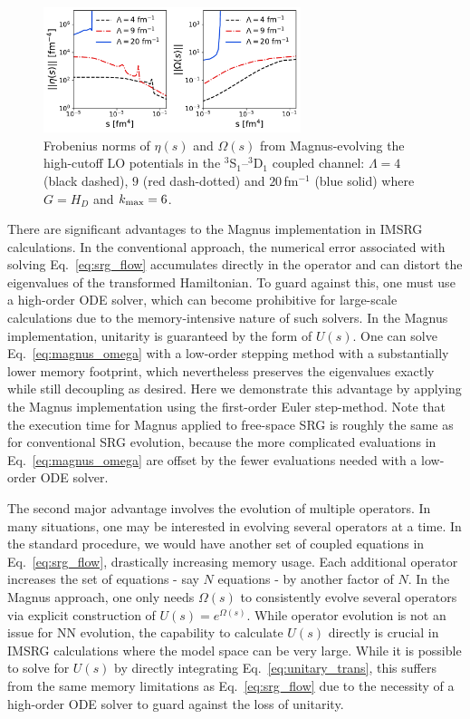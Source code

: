 \documentclass[10pt,aps,prc,floatfix,twocolumn,nofootinbib]{revtex4-1}
\begin{document}
%
\begin{figure}[tbh]
	\includegraphics[clip,width=0.67\textwidth]{eta_omega_norms_kvnns_900_901_902_3S1_Wegner_k_magnus_6_ds1p0e-05.pdf}%
	\caption{Frobenius norms of $\eta(s)$ and $\Omega(s)$ from Magnus-evolving the high-cutoff LO potentials in the $^3$S$_1$--$^3$D$_1$ coupled channel: $\Lambda=4$ (black dashed), $9$ (red dash-dotted) and $20$\,fm$^{-1}$ (blue solid) where $G=H_D$ and $k_{\rm max}=6$.}
	\label{fig:eta_omega_norms}
\end{figure}
%

There are significant advantages to the Magnus implementation in IMSRG calculations.
In the conventional approach, the numerical error associated with solving Eq.~\eqref{eq:srg_flow} accumulates directly in the operator and can distort the eigenvalues of the transformed Hamiltonian.
To guard against this, one must use a high-order ODE solver, which can become prohibitive for large-scale calculations due to the memory-intensive nature of such solvers.  
In the Magnus implementation, unitarity is guaranteed by the form of $U(s)$.
One can solve Eq.~\eqref{eq:magnus_omega} with a low-order stepping method with a substantially lower memory footprint, which nevertheless preserves the eigenvalues exactly while still decoupling as desired.
Here we demonstrate this advantage by applying the Magnus implementation using the first-order Euler step-method.
Note that the execution time for Magnus applied to free-space SRG is roughly the same as for conventional SRG evolution, because the more complicated evaluations in Eq.~\eqref{eq:magnus_omega} are offset by the fewer evaluations needed with a low-order ODE solver.


The second major advantage involves the evolution of multiple operators.
In many situations, one may be interested in evolving several operators at a time.
In the standard procedure, we would have another set of coupled equations in Eq.~\eqref{eq:srg_flow}, drastically increasing memory usage.
Each additional operator increases the set of equations - say $N$ equations - by another factor of $N$.
In the Magnus approach, one only needs $\Omega(s)$ to consistently evolve several operators via explicit construction of $U(s)=e^{\Omega(s)}$.
While operator evolution is not an issue for NN evolution, the capability to calculate $U(s)$ directly is crucial in IMSRG calculations where the model space can be very large.
While it is possible to solve for $U(s)$ by directly integrating Eq.~\eqref{eq:unitary_trans}, this suffers from the same memory limitations as Eq.~\eqref{eq:srg_flow} due to the necessity of a high-order ODE solver to guard against the loss of unitarity.
\end{document}
